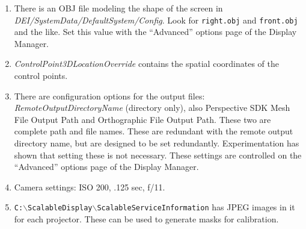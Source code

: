 \documentclass[11pt]{article}
\newcommand{\cmd}[1]{\texttt{#1}\xspace}
\newcommand{\dir}[1]{\textit{#1}\xspace}
\newcommand{\menu}[1]{``#1''\xspace}
\newcommand{\file}[1]{\texttt{#1}\xspace}
\newcommand{\bs}{$\backslash$}
\begin{document}
\begin{enumerate}
\item There is an OBJ file modeling the shape of the screen in
  \dir{DEI/SystemData/DefaultSystem/Config}.  Look for \cmd{right.obj}
  and \cmd{front.obj} and the like.  Set this value with the
  \menu{Advanced} options page of the Display Manager.

\item \dir{ControlPoint3DLocationOverride} contains the spatial coordinates
  of the control points.

\item There are configuration options for the output files:
  \dir{RemoteOutputDirectoryName} (directory only), also Perspective
  SDK Mesh File Output Path and Orthographic File Output Path.  These two are
  complete path and file names.  These are redundant with the remote
  output directory name, but are designed to be set redundantly.
  Experimentation has shown that setting these is not necessary.
  These settings are controlled on the
``Advanced'' options page of the Display Manager.

\item Camera settings: ISO 200, .125 sec, f/11.

\item \file{C:\bs ScalableDisplay\bs ScalableServiceInformation} has
  JPEG images in it for each projector.  These can be used to generate
  masks for calibration.

\end{enumerate}










\end{document}
